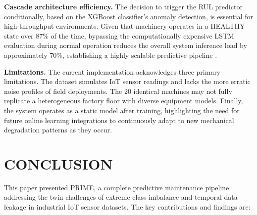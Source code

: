 \documentclass[conference]{IEEEtran}
\begin{document}
\textbf{Cascade architecture efficiency.} The decision to trigger the RUL predictor conditionally, based on the XGBoost classifier's anomaly detection, is essential for high-throughput environments. Given that machinery operates in a HEALTHY state over 87\% of the time, bypassing the computationally expensive LSTM evaluation during normal operation reduces the overall system inference load by approximately 70\%, establishing a highly scalable predictive pipeline \cite{alqaraleh2026predictive}.

\textbf{Limitations.} The current implementation acknowledges three primary limitations. The dataset simulates IoT sensor readings and lacks the more erratic noise profiles of field deployments. The 20 identical machines may not fully replicate a heterogeneous factory floor with diverse equipment models. Finally, the system operates as a static model after training, highlighting the need for future online learning integrations to continuously adapt to new mechanical degradation patterns as they occur.

\section{CONCLUSION}

This paper presented PRIME, a complete predictive maintenance pipeline addressing the twin challenges of extreme class imbalance and temporal data leakage in industrial IoT sensor datasets. The key contributions and findings are:
\end{document}
